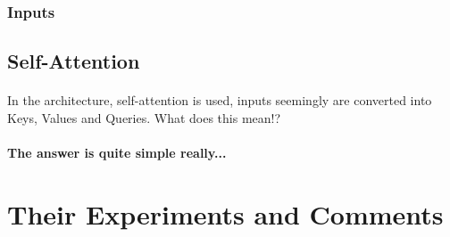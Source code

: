 \documentclass{article}
\begin{document}
    \subsubsection{Inputs}
    

    \subsection{Self-Attention}
    \paragraph{} In the architecture, self-attention is used, inputs seemingly are converted into Keys, Values and Queries. What does this mean!?
    \paragraph{The answer is quite simple really...} 


    \section{Their Experiments and Comments}
\end{document}
